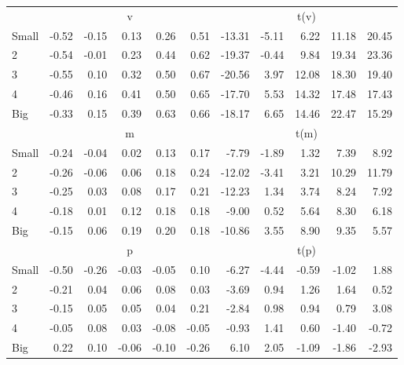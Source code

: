 \begin{table}[!ht]
\begin{tabular}{lrrrrrrrrrr}
  
     & \multicolumn{5}{c}{v} & \multicolumn{5}{c}{t(v)}   \\
     \cmidrule(r){2-6} \cmidrule(r){7-11} 
    Small  & -0.52  & -0.15  & 0.13  & 0.26  & 0.51  & -13.31  & -5.11  & 6.22  & 11.18  & 20.45   \\
    2  & -0.54  & -0.01  & 0.23  & 0.44  & 0.62  & -19.37  & -0.44  & 9.84  & 19.34  & 23.36   \\
    3  & -0.55  & 0.10  & 0.32  & 0.50  & 0.67  & -20.56  & 3.97  & 12.08  & 18.30  & 19.40   \\
    4  & -0.46  & 0.16  & 0.41  & 0.50  & 0.65  & -17.70  & 5.53  & 14.32  & 17.48  & 17.43   \\
    Big  & -0.33  & 0.15  & 0.39  & 0.63  & 0.66  & -18.17  & 6.65  & 14.46  & 22.47  & 15.29   \\
    
  
     & \multicolumn{5}{c}{m} & \multicolumn{5}{c}{t(m)}   \\
     \cmidrule(r){2-6} \cmidrule(r){7-11} 
    Small  & -0.24  & -0.04  & 0.02  & 0.13  & 0.17  & -7.79  & -1.89  & 1.32  & 7.39  & 8.92   \\
    2  & -0.26  & -0.06  & 0.06  & 0.18  & 0.24  & -12.02  & -3.41  & 3.21  & 10.29  & 11.79   \\
    3  & -0.25  & 0.03  & 0.08  & 0.17  & 0.21  & -12.23  & 1.34  & 3.74  & 8.24  & 7.92   \\
    4  & -0.18  & 0.01  & 0.12  & 0.18  & 0.18  & -9.00  & 0.52  & 5.64  & 8.30  & 6.18   \\
    Big  & -0.15  & 0.06  & 0.19  & 0.20  & 0.18  & -10.86  & 3.55  & 8.90  & 9.35  & 5.57   \\
    
  
     & \multicolumn{5}{c}{p} & \multicolumn{5}{c}{t(p)}   \\
     \cmidrule(r){2-6} \cmidrule(r){7-11} 
    Small  & -0.50  & -0.26  & -0.03  & -0.05  & 0.10  & -6.27  & -4.44  & -0.59  & -1.02  & 1.88   \\
    2  & -0.21  & 0.04  & 0.06  & 0.08  & 0.03  & -3.69  & 0.94  & 1.26  & 1.64  & 0.52   \\
    3  & -0.15  & 0.05  & 0.05  & 0.04  & 0.21  & -2.84  & 0.98  & 0.94  & 0.79  & 3.08   \\
    4  & -0.05  & 0.08  & 0.03  & -0.08  & -0.05  & -0.93  & 1.41  & 0.60  & -1.40  & -0.72   \\
    Big  & 0.22  & 0.10  & -0.06  & -0.10  & -0.26  & 6.10  & 2.05  & -1.09  & -1.86  & -2.93   \\
    
  
  \bottomrule
\end{tabular}
\label{tbl:25_Size_BM_B16}
\end{table}
